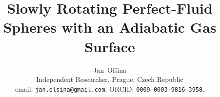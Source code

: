 \documentclass[journal,a4paper]{IEEEtran}
\date{}
\begin{document}
\title{Slowly Rotating Perfect-Fluid Spheres with an Adiabatic Gas Surface}
\author{Jan~Ol\v{s}ina\\[1ex] Independent Researcher, Prague, Czech Republic\\
email: \texttt{jan.olsina@gmail.com}, ORCID: \texttt{0009-0003-9816-3958}.}
\maketitle
\end{document}
